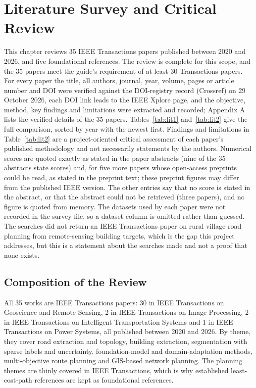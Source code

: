 \documentclass[12pt,a4paper]{report}
\begin{document}
\chapter{Literature Survey and Critical Review}\label{ch:lit}
This chapter reviews 35 IEEE Transactions papers published between 2020 and 2026, and five foundational references. The review is complete for this scope, and the 35 papers meet the guide's requirement of at least 30 Transactions papers. For every paper the title, all authors, journal, year, volume, pages or article number and DOI were verified against the DOI-registry record (Crossref) on 29 October 2026, each DOI link leads to the IEEE Xplore page, and the objective, method, key findings and limitations were extracted and recorded; Appendix A lists the verified details of the 35 papers. Tables~\ref{tab:lit1} and~\ref{tab:lit2} give the full comparison, sorted by year with the newest first. Findings and limitations in Table~\ref{tab:lit2} are a project-oriented critical assessment of each paper's published methodology and not necessarily statements by the authors. Numerical scores are quoted exactly as stated in the paper abstracts (nine of the 35 abstracts state scores) and, for five more papers whose open-access preprints could be read, as stated in the preprint text; these preprint figures may differ from the published IEEE version. The other entries say that no score is stated in the abstract, or that the abstract could not be retrieved (three papers), and no figure is quoted from memory. The datasets used by each paper were not recorded in the survey file, so a dataset column is omitted rather than guessed. The searches did not return an IEEE Transactions paper on rural village road planning from remote-sensing building targets, which is the gap this project addresses, but this is a statement about the searches made and not a proof that none exists.

\section{Composition of the Review}
All 35 works are IEEE Transactions papers: 30 in IEEE Transactions on Geoscience and Remote Sensing, 2 in IEEE Transactions on Image Processing, 2 in IEEE Transactions on Intelligent Transportation Systems and 1 in IEEE Transactions on Power Systems, all published between 2020 and 2026. By theme, they cover road extraction and topology, building extraction, segmentation with sparse labels and uncertainty, foundation-model and domain-adaptation methods, multi-objective route planning and GIS-based network planning. The planning themes are thinly covered in IEEE Transactions, which is why established least-cost-path references are kept as foundational references.
\end{document}
